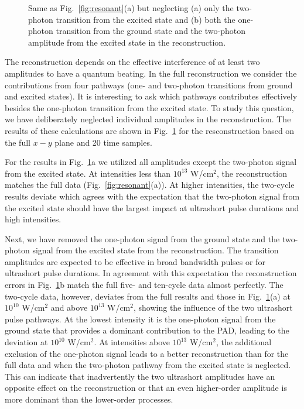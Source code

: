 \begin{figure}[t]
\centering
\caption{Same as Fig.\ \ref{fig:resonant}(a) but neglecting (a) only the two-photon transition from the excited state and (b) both the one-photon transition from the ground state and the two-photon amplitude from the excited state in the reconstruction. 
} 
  \label{fig:pathways}
\end{figure}

The reconstruction depends on the effective interference of at least two amplitudes to have a quantum beating. In the full reconstruction we consider the contributions from four pathways (one- and two-photon transitions from ground and excited states). It is interesting to ask which pathways contributes effectively besides the one-photon transition from the excited state. To study this question, we have deliberately neglected individual amplitudes in the reconstruction. The results of these calculations are shown in Fig.\ \ref{fig:pathways} for the resconstruction based on the full $x-y$ plane and 20 time samples.

For the results in Fig.~\ref{fig:pathways}a we utilized all amplitudes except the two-photon signal from the excited state. At intensities less than $10^{13}$ W/cm$^2$, the reconstruction matches the full data (Fig.~\ref{fig:resonant}(a)). At higher intensities, the two-cycle results deviate which agrees with the expectation that the two-photon signal from the excited state should have the largest impact at ultrashort pulse durations and high intensities. 

Next, we have removed the one-photon signal from the ground state and the two-photon signal from the excited state from the reconstruction. The transition amplitudes are expected to be effective in broad bandwidth pulses or for ultrashort pulse durations. In agreement with this expectation the reconstruction errors in Fig.~\ref{fig:pathways}b match the full five- and ten-cycle data almost perfectly. The two-cycle data, however, deviates from the full results and those in Fig.~\ref{fig:pathways}(a) at $10^{10}$ W/cm$^2$ and above $10^{13}$ W/cm$^2$, showing the influence of the two ultrashort pulse pathways. At the lowest intensity it is the one-photon signal from the ground state that provides a dominant contribution to the PAD, leading to the deviation at $10^{10}$ W/cm$^2$. At intensities above $10^{13}$ W/cm$^2$, the additional exclusion of the one-photon signal leads to a better reconstruction than for the full data and when the two-photon pathway from the excited state is neglected. This can indicate that inadvertently the two ultrashort amplitudes have an opposite effect on the reconstruction or that an even higher-order amplitude is more dominant than the lower-order processes.

